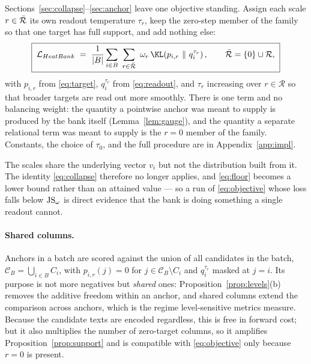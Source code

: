 \section{\method}
\label{sec:method}

Sections~\ref{sec:collapse}--\ref{sec:anchor} leave one objective standing. Assign each
scale $r\in\bar{\mathcal{R}}$ its own readout temperature $\tau_r$, keep the zero-step member of the
family so that one target has full support, and add nothing else:
\begin{equation}
    \boxed{\;
    \mathcal{L}_{\method}
    \;=\;
    \frac{1}{|B|}\sum_{i\in B}\ \sum_{r\in\Rset}\ \omega_r\,
    \KL\!\left(p_{i,r}\ \middle\Vert\ q_i^{\tau_r}\right),
    \qquad
    \Rset=\{0\}\cup\mathcal{R},
    \;}
    \label{eq:objective}
\end{equation}
with $p_{i,r}$ from \eqref{eq:target}, $q_i^{\tau_r}$ from \eqref{eq:readout}, and
$\tau_r$ increasing over $r\in\mathcal{R}$ so that broader targets are read out more
smoothly. There is one term and no balancing weight: the quantity a pointwise anchor was
meant to supply is produced by the bank itself (Lemma~\ref{lem:gauge}), and the quantity a
separate relational term was meant to supply is the $r=0$ member of the family. Constants,
the choice of $\tau_0$, and the full procedure are in Appendix~\ref{app:impl}.

The scales share the underlying vector $v_i$ but not the distribution built from it. The
identity \eqref{eq:collapse} therefore no longer applies, and \eqref{eq:floor} becomes a
lower bound rather than an attained value --- so a run of \eqref{eq:objective} whose loss
falls below $\mathrm{JS}_\omega$ is direct evidence that the bank is doing something a single
readout cannot.

\paragraph{Shared columns.}
Anchors in a batch are scored against the union of all candidates in the batch,
$\mathcal{C}_B = \bigcup_{i\in B} C_i$, with $p_{i,r}(j) = 0$ for
$j \in \mathcal{C}_B\setminus C_i$ and $q_i^{\tau_r}$ masked at $j=i$. Its purpose is not
more negatives but \emph{shared} ones: Proposition~\ref{prop:levels}(b) removes the additive
freedom within an anchor, and shared columns extend the comparison across anchors, which is
the regime level-sensitive metrics measure. Because the candidate texts are encoded regardless,
this is free in forward cost; but it also multiplies the number of zero-target columns, so
it amplifies Proposition~\ref{prop:support} and is compatible with \eqref{eq:objective} only
because $r=0$ is present.


